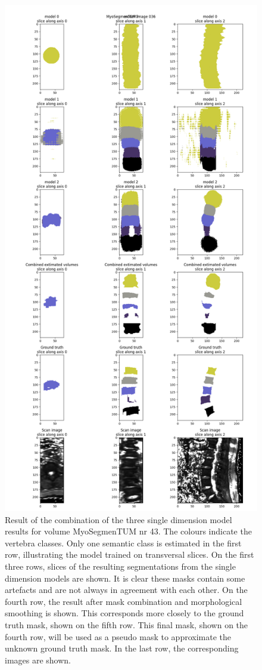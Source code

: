 \begin{figure}
    \centering
    \includegraphics[width=.95\textwidth]{images/morphmask_denoise1_erode1_MyoSegmenTUM_036.png}
    \caption{
        Result of the combination of the three single dimension model results for volume MyoSegmenTUM nr 43.
        The colours indicate the vertebra classes. Only one semantic class is estimated in the first row, illustrating the model trained on transversal slices.
        On the first three rows, slices of the resulting segmentations from the single dimension models are shown. 
        It is clear these masks contain some artefacts and are not always in agreement with each other.
        On the fourth row, the result after mask combination and morphological smoothing is shown. 
        This corresponds more closely to the ground truth mask, shown on the fifth row.
        This final mask, shown on the fourth row, will be used as a pseudo mask to approximate the unknown ground truth mask.
        In the last row, the corresponding images are shown.
    }
\end{figure}

